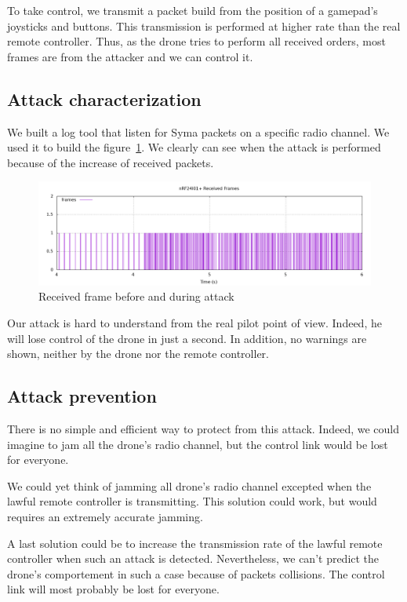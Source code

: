\documentclass[conference,a4paper]{IEEEtran}
\begin{document}
To take control, we transmit a packet build from the position of a gamepad's joysticks and
buttons. This transmission is performed at higher rate than the real remote controller.
Thus, as the drone tries to perform all received orders, most frames are from the attacker
and we can control it.

\subsection{Attack characterization}
We built a log tool that listen for Syma packets on a specific radio channel. We used it
to build the figure~\ref{fig:syma}. We clearly can see when the attack is performed
because of the increase of received packets.

\begin{figure}[!hb]
  \centering
  \includegraphics[width=\linewidth]{../Rapport/img/gnuplot-trames-emises.png}
  \caption{Received frame before and during attack}%
  \label{fig:syma}
\end{figure}

Our attack is hard to understand from the real pilot point of view. Indeed, he will lose
control of the drone in just a second. In addition, no warnings are shown, neither by the
drone nor the remote controller.

\subsection{Attack prevention}
There is no simple and efficient way to protect from this attack. Indeed, we could imagine
to jam all the drone's radio channel, but the control link would be lost for
everyone.

We could yet think of jamming all drone's radio channel excepted when the lawful remote
controller is transmitting. This solution could work, but would requires an extremely
accurate jamming.

A last solution could be to increase the transmission rate of the lawful remote controller
when such an attack is detected. Nevertheless, we can't predict the drone's comportement
in such a case because of packets collisions. The control link will most probably be lost
for everyone.
\end{document}

